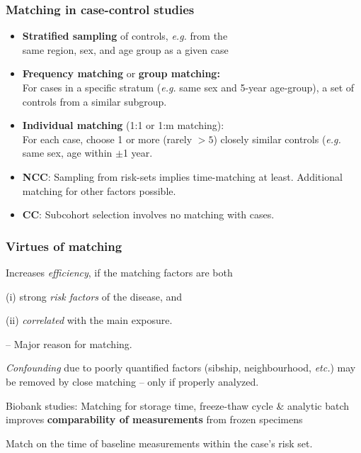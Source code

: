 \documentclass[12pt,dvipsnames,t,handout%
,aspectratio=169%
]{beamer}
\begin{document}

\begin{frame}
\frametitle{Matching in case-control studies}
\pause
\begin{itemize}
\item {\bf Stratified sampling} of controls,  {\it e.g.} from 
the \\ same region, sex, and age group as a given case 
\pause\medskip
   \item {\bf Frequency matching} or {\bf group matching:} \\
  For cases in a specific stratum 
  ({\it e.g.} same sex and 5-year age-group), %
a set of controls from a similar subgroup. %
\medskip
		\pause
		  \medskip		
\item {\bf Individual matching} (1:1 or 1:m matching):\\
		For each case, choose 1 or more (rarely $>5$) closely similar
		controls (\textit{e.g.} same sex, age within $\pm$1 year. 
		\pause
	\medskip
\item
{\bf NCC}: Sampling from risk-sets 
implies time-matching at least.
Additional matching for other factors possible. 
\pause
	\medskip
\item
{\bf CC}: Subcohort selection involves no matching with cases.	
		\end{itemize}

\end{frame}
\begin{frame}
\frametitle{Virtues of matching}
\pause
\begin{itemize}
 \item Increases {\it efficiency}, 
 if the matching factors are both
 \bi
 {\normalsize
 \item[ ]
   (i) strong
	 \textit{risk factors} of the disease, and 
\item[ ](ii) 
	 \textit{correlated} with the main exposure. 
}
\ei	 
\pause
	-- Major reason for matching.  
	\pause   
\medskip   
\item \textit{Confounding} due to poorly
quantified factors (sibship, 
   neighbourhood, {\it etc.}) may be removed by close matching  
  -- only if properly analyzed. 
	\pause\medskip
\item Biobank studies: Matching
  for storage time, %
  freeze-thaw cycle \& analytic batch improves \textbf{comparability of measurements}
	from frozen specimens 
\bi
\item[$\to$] 
{\normalsize
  Match on the time of baseline measurements within the case's risk set.
  }
\ei   
\end{itemize}

\end{frame} 
\end{document}
